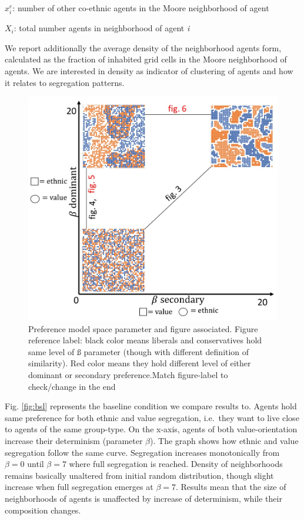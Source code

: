 \documentclass[
]{article}
\begin{document}
\(x^e_i\): number of other co-ethnic agents in the Moore neighborhood of
agent 

\par

\(X_i\): total number agents in neighborhood of agent \textit{i}

\par
\par

We report additionally the average density of the neighborhood agents
form, calculated as the fraction of inhabited grid cells in the Moore
neighborhood of agents. We are interested in density as indicator of
clustering of agents and how it relates to segregation patterns.

\begin{figure}[h]

{\centering \includegraphics[width=0.7\linewidth]{model_space} 

}

\caption{Preference model space parameter and figure associated. Figure reference label: black color means liberals and conservatives hold same level of ß parameter (though with different definition of similarity). Red color means they hold different level of either dominant or secondary preference.Match figure-label to check/change in the end}\label{fig:model_space}
\end{figure}

Fig. \ref{fig:bsl} represents the baseline condition we compare results
to. Agents hold same preference for both ethnic and value segregation,
i.e.~they want to live close to agents of the same group-type. On the
x-axis, agents of both value-orientation increase their determinism
(parameter \(\beta\)). The graph shows how ethnic and value segregation
follow the same curve. Segregation increases monotonically from
\(\beta = 0\) until \(\beta = 7\) where full segregation is reached.
Density of neighborhoods remains basically unaltered from initial random
distribution, though slight increase when full segregation emerges at
\(\beta = 7\). Results mean that the size of neighborhoods of agents is
unaffected by increase of determinism, while their composition changes.
\end{document}
